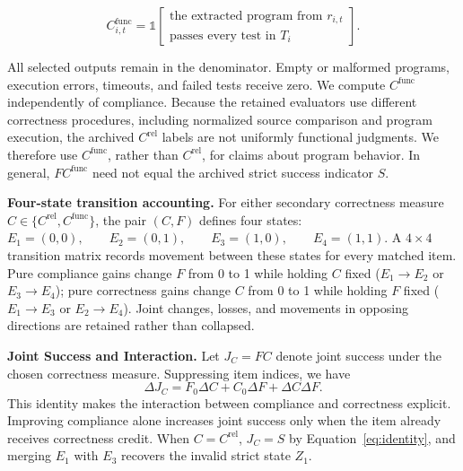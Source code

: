 \documentclass{article}
\begin{document}
\begin{equation}
C^{\mathrm{func}}_{i,t}
=
\mathbb{1}
\!\left[
\begin{gathered}
\text{the extracted program from }r_{i,t}\\
\text{passes every test in }T_i
\end{gathered}
\right].
\label{eq:functional}
\end{equation}

All selected outputs remain in the denominator. Empty or malformed programs, execution errors, timeouts, and failed tests receive zero. We compute $C^{\mathrm{func}}$ independently of compliance. Because the retained evaluators use different correctness procedures, including normalized source comparison and program execution, the archived $C^{\mathrm{rel}}$ labels are not uniformly functional judgments. We therefore use $C^{\mathrm{func}}$, rather than $C^{\mathrm{rel}}$, for claims about program behavior. In general, $FC^{\mathrm{func}}$ need not equal the archived strict success indicator $S$.

\noindent\textbf{Four-state transition accounting.}
For either secondary correctness measure $C\in\{C^{\mathrm{rel}},C^{\mathrm{func}}\}$, the pair $(C,F)$ defines four states:
$
E_1=(0,0),\qquad
E_2=(0,1),\qquad
E_3=(1,0),\qquad
E_4=(1,1).
$
A \(4\times4\) transition matrix records movement between these states for every matched item. Pure compliance gains change \(F\) from 0 to 1 while holding \(C\) fixed (\(E_1\!\rightarrow\!E_2\) or \(E_3\!\rightarrow\!E_4\)); pure correctness gains change \(C\) from 0 to 1 while holding \(F\) fixed (\(E_1\!\rightarrow\!E_3\) or \(E_2\!\rightarrow\!E_4\)). Joint changes, losses, and movements in opposing directions are retained rather than collapsed.

\noindent\textbf{Joint Success and Interaction.}
Let $J_C=FC$ denote joint success under the chosen correctness measure. Suppressing item indices, we have
\begin{equation}
\Delta J_C
=F_0\Delta C+C_0\Delta F+\Delta C\Delta F.
\label{eq:transition_identity}
\end{equation}
This identity makes the interaction between compliance and correctness explicit. Improving compliance alone increases joint success only when the item already receives correctness credit. When $C=C^{\mathrm{rel}}$, $J_C=S$ by Equation~\eqref{eq:identity}, and merging $E_1$ with $E_3$ recovers the invalid strict state $Z_1$.
\end{document}
